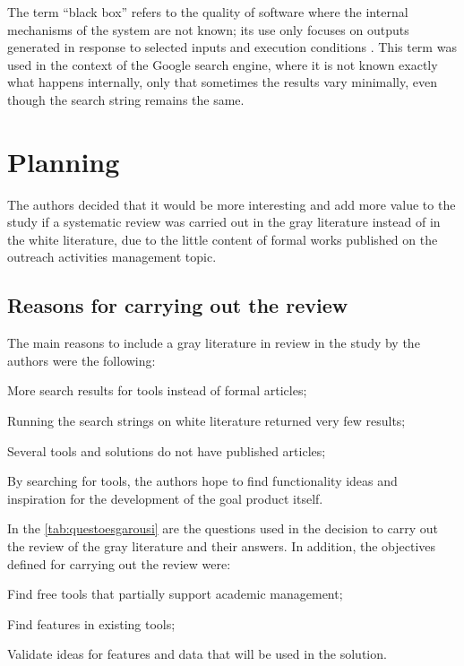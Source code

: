 The term ``black box'' refers to the quality of software where the internal mechanisms of the system are not known; its use only focuses on outputs generated in response to selected inputs and execution conditions \cite{nidhra2012black}. This term was used in the context of the Google search engine, where it is not known exactly what happens internally, only that sometimes the results vary minimally, even though the search string remains the same.

\section{Planning}\label{sec:gl-planning}

The authors decided that it would be more interesting and add more value to the study if a systematic review was carried out in the gray literature instead of in the white literature, due to the little content of formal works published on the outreach activities management topic.

\subsection{Reasons for carrying out the review}\label{sec:gl-planning-motives}

The main reasons to include a gray literature in review in the study by the authors were the following:
\begin{inparaenum}[(i)]
  \item More search results for tools instead of formal articles;
  \item Running the search strings on white literature returned very few results;
  \item Several tools and solutions do not have published articles;
  \item By searching for tools, the authors hope to find functionality ideas and inspiration for the development of the goal product itself.
\end{inparaenum}

In the \autoref{tab:questoesgarousi} are the questions used in the decision to carry out the review of the gray literature and their answers. In addition, the objectives defined for carrying out the review were:

\begin{inparaenum}[(i)]
  \item Find free tools that partially support academic management;
  \item Find features in existing tools;
  \item Validate ideas for features and data that will be used in the solution.
\end{inparaenum}

